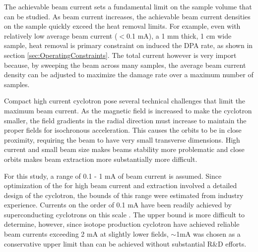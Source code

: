 \documentclass[final,3p,times,twocolumn]{elsarticle} %
\begin{document}
The achievable beam current sets a fundamental limit on the sample volume that can be studied.  As beam current increases, the achievable beam current densities on the sample quickly exceed the heat removal limits.  For example, even with relatively low average beam current ($<$0.1 mA), a 1 mm thick, 1 cm wide sample, heat removal is primary constraint on induced the DPA rate, as shown in section \ref{sec:OperatingConstraints}.  The total current however is very import because, by sweeping the beam across many samples, the average beam current density can be adjusted to maximize the damage rate over a maximum number of samples.  

Compact high current cyclotron pose several technical challenges that limit the maximum beam current.  As the magnetic field is increased to make the cyclotron smaller, the field gradients in the radial direction must increase to maintain the proper fields for isochronous acceleration. This causes the orbits to be in close proximity, requiring the beam to have very small transverse dimensions.  High current and small beam size makes beams stability more problematic and close orbits makes beam extraction more substantially more difficult.  

For this study, a range of 0.1 - 1 mA of beam current is assumed.  Since optimization of the for high beam current and extraction involved a detailed design of the cyclotron, the bounds of this range were estimated from industry experience.  Currents on the order of 0.1 mA have been readily achieved by superconducting cyclotrons on this scale \cite{???}.  The upper bound is more difficult to determine, however, since isotope production cyclotron have achieved reliable beam currents exceeding 2 mA \cite{Jongen201047} \cite{???} at slightly lower fields, $\sim$1mA was chosen as a conservative upper limit than can be achieved without substantial R\&D efforts.




%
%
\end{document}

